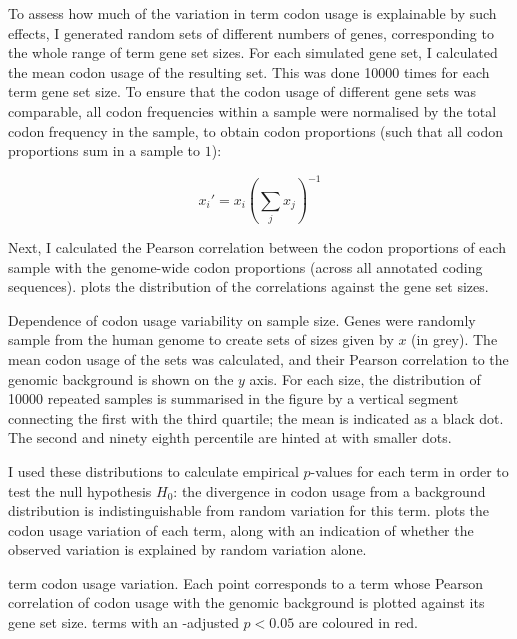 To assess how much of the variation in \go term codon usage is explainable by
such effects, I generated random sets of different numbers of genes,
corresponding to the whole range of \go term gene set sizes. For each simulated
gene set, I calculated the mean codon usage of the resulting set. This was done
\num{10000} times for each \go term gene set size. To ensure that the codon
usage of different gene sets was comparable, all codon frequencies within a
sample were normalised by the total codon frequency in the sample, to obtain
codon proportions (such that all codon proportions sum in a sample to \(1\)):

\begin{equation}
    x_i' = x_i \left(\sum_j x_j\right)^{-1}
\end{equation}

Next, I calculated the Pearson correlation between the codon proportions of each
sample with the genome-wide codon proportions (across all annotated coding
sequences).  plots the distribution of the
correlations against the gene set sizes.

    {Dependence of codon usage variability on sample size.}
    {Genes were randomly sample from the human genome to create sets of sizes
    given by \(x\) (in grey). The mean codon usage of the sets was calculated,
    and their Pearson correlation to the genomic background is shown on the
    \(y\) axis. For each size, the distribution of \num{10000} repeated samples
    is summarised in the figure by a vertical segment connecting the first with
    the third quartile; the mean is indicated as a black dot. The second and
    ninety eighth percentile are hinted at with smaller dots.}

I used these distributions to calculate empirical \(p\)-values for each \go term
in order to test the null hypothesis \(H_0\): the divergence in codon usage from
a background distribution is indistinguishable from random variation for this
\go term.  plots the codon usage variation
of each \go term, along with an indication of whether the observed variation is
explained by random variation alone.

    {\go term codon usage variation.}
    {Each point corresponds to a \go term whose Pearson correlation of codon
    usage with the genomic background is plotted against its gene set size.
    \go terms with an \fdr-adjusted \(p < 0.05\) are coloured in red.}

